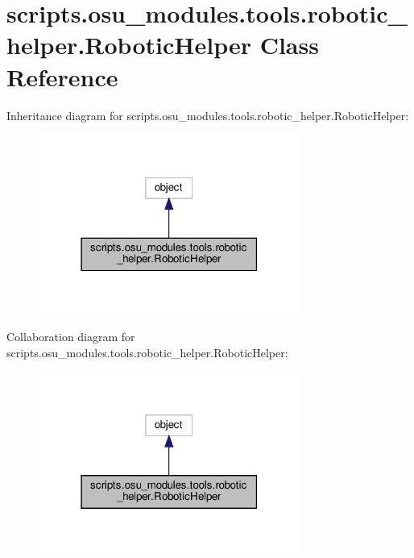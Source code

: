 \hypertarget{classscripts_1_1osu__modules_1_1tools_1_1robotic__helper_1_1RoboticHelper}{}\section{scripts.\+osu\+\_\+modules.\+tools.\+robotic\+\_\+helper.\+Robotic\+Helper Class Reference}
\label{classscripts_1_1osu__modules_1_1tools_1_1robotic__helper_1_1RoboticHelper}


Inheritance diagram for scripts.\+osu\+\_\+modules.\+tools.\+robotic\+\_\+helper.\+Robotic\+Helper\+:\nopagebreak
\begin{figure}[H]
\begin{center}
\leavevmode
\includegraphics[width=243pt]{da/df5/classscripts_1_1osu__modules_1_1tools_1_1robotic__helper_1_1RoboticHelper__inherit__graph}
\end{center}
\end{figure}


Collaboration diagram for scripts.\+osu\+\_\+modules.\+tools.\+robotic\+\_\+helper.\+Robotic\+Helper\+:\nopagebreak
\begin{figure}[H]
\begin{center}
\leavevmode
\includegraphics[width=243pt]{dc/dad/classscripts_1_1osu__modules_1_1tools_1_1robotic__helper_1_1RoboticHelper__coll__graph}
\end{center}
\end{figure}
